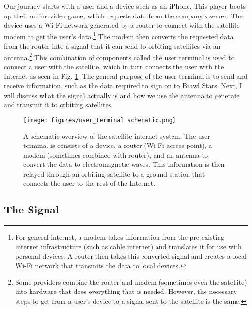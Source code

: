 \documentclass[10pt]{article}
\begin{document}
Our journey starts with a user and a device such as an iPhone. This player boots up their online video game, which requests data from the company's server. The device uses a Wi-Fi network generated by a router to connect with the satellite modem to get the user's data.\footnote{For general internet, a modem takes information from the pre-existing internet infrastructure (such as cable internet) and translates it for use with personal devices. A router then takes this converted signal and creates a local Wi-Fi network that transmits the data to local devices.}\cite{router_modem} The modem then converts the requested data from the router into a signal that it can send to orbiting satellites via an antenna.\footnote{Some providers combine the router and modem (sometimes even the satellite) into hardware that does everything that is needed. However, the necessary steps to get from a user's device to a signal sent to the satellite is the same.} This combination of components called the user terminal is used to connect a user with the satellite, which in turn connects the user with the Internet as seen in Fig. \ref{fig:user_terminal}. The general purpose of the user terminal is to send and receive information, such as the data required to sign on to Brawl Stars. Next, I will discuss what the signal actually is and how we use the antenna to generate and transmit it to orbiting satellites.

\begin{figure}[h!]
\centering
\texttt{[image: figures/user\_terminal schematic.png]}
\caption{A schematic overview of the satellite internet system. The user terminal is consists of a device, a router (Wi-Fi access point), a modem (sometimes combined with router), and an antenna to convert the data to electromagnetic waves. This information is then relayed through an orbiting satellite to a ground station that connects the user to the rest of the Internet.}
\label{fig:user_terminal}
\end{figure}

\subsection{The Signal}
\label{signal}
\end{document}
